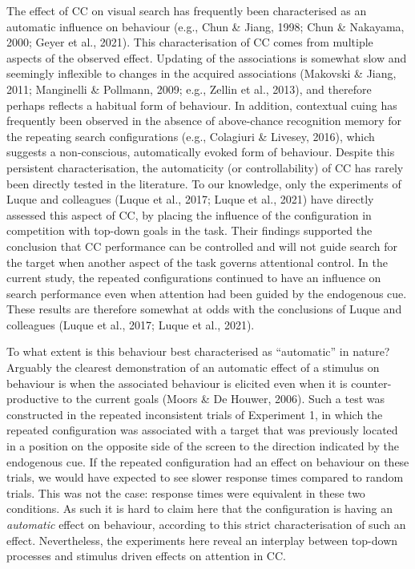 \documentclass[
  man,
  floatsintext,
  longtable,
  nolmodern,
  notxfonts,
  notimes,
  colorlinks=true,linkcolor=blue,citecolor=blue,urlcolor=blue]{apa7}
\begin{document}
The effect of CC on visual search has frequently been characterised as
an automatic influence on behaviour (e.g., Chun \& Jiang, 1998; Chun \&
Nakayama, 2000; Geyer et al., 2021). This characterisation of CC comes
from multiple aspects of the observed effect. Updating of the
associations is somewhat slow and seemingly inflexible to changes in the
acquired associations (Makovski \& Jiang, 2011; Manginelli \& Pollmann,
2009; e.g., Zellin et al., 2013), and therefore perhaps reflects a
habitual form of behaviour. In addition, contextual cuing has frequently
been observed in the absence of above-chance recognition memory for the
repeating search configurations (e.g., Colagiuri \& Livesey, 2016),
which suggests a non-conscious, automatically evoked form of behaviour.
Despite this persistent characterisation, the automaticity (or
controllability) of CC has rarely been directly tested in the
literature. To our knowledge, only the experiments of Luque and
colleagues (Luque et al., 2017; Luque et al., 2021) have directly
assessed this aspect of CC, by placing the influence of the
configuration in competition with top-down goals in the task. Their
findings supported the conclusion that CC performance can be controlled
and will not guide search for the target when another aspect of the task
governs attentional control. In the current study, the repeated
configurations continued to have an influence on search performance even
when attention had been guided by the endogenous cue. These results are
therefore somewhat at odds with the conclusions of Luque and colleagues
(Luque et al., 2017; Luque et al., 2021).

To what extent is this behaviour best characterised as ``automatic'' in
nature? Arguably the clearest demonstration of an automatic effect of a
stimulus on behaviour is when the associated behaviour is elicited even
when it is counter-productive to the current goals (Moors \& De Houwer,
2006). Such a test was constructed in the repeated inconsistent trials
of Experiment 1, in which the repeated configuration was associated with
a target that was previously located in a position on the opposite side
of the screen to the direction indicated by the endogenous cue. If the
repeated configuration had an effect on behaviour on these trials, we
would have expected to see slower response times compared to random
trials. This was not the case: response times were equivalent in these
two conditions. As such it is hard to claim here that the configuration
is having an \emph{automatic} effect on behaviour, according to this
strict characterisation of such an effect. Nevertheless, the experiments
here reveal an interplay between top-down processes and stimulus driven
effects on attention in CC.
\end{document}
